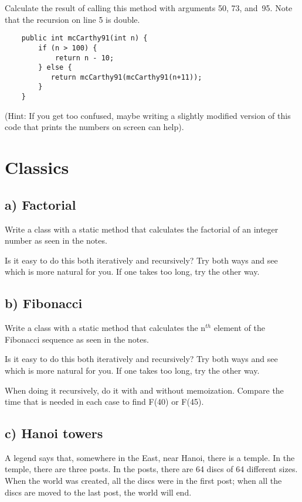 \documentclass{article}
\begin{document}
Calculate the result of calling this method with arguments 50, 73, 
and~95. Note that the recursion on line 5 is double. 

\begin{verbatim}
    public int mcCarthy91(int n) {
        if (n > 100) {
            return n - 10;
        } else {
           return mcCarthy91(mcCarthy91(n+11));
        }
    }
\end{verbatim}

(Hint: If you get too confused, maybe writing a slightly modified
version of this code that prints the numbers on screen can help).

\section{Classics}

\subsection{a) Factorial }

Write a class with a static method that calculates the factorial of an
integer number as seen in the notes. 

Is it easy to do this both iteratively and recursively? Try both ways
and see which is more natural for you. If one takes too long, try the
other way. 

\subsection{b) Fibonacci }

Write a class with a static method that calculates the n$^{th}$ element
of the Fibonacci sequence as seen in the notes. 

Is it easy to do this both iteratively and recursively? Try both ways
and see which is more natural for you. If one takes too long, try the
other way. 

When doing it recursively, do it with and without memoization. Compare
the time that is needed in each case to find F(40) or F(45). 

\subsection{c) Hanoi towers}

A legend says that, somewhere in the East, near Hanoi, there is a
temple. In the temple, there are three posts. In the posts, there are
64 discs of 64 different sizes. When the world was created, all the
discs were in the first post; when all the discs are moved to the
last post, the world will end. 
\end{document}
